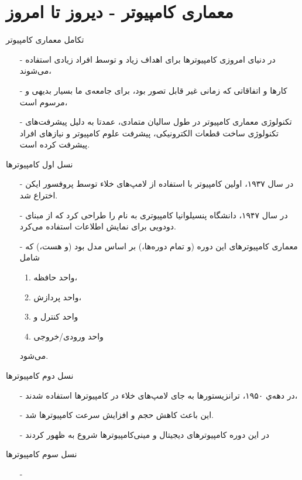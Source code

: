 \section{معماری کامپیوتر - دیروز تا امروز}
\begin{frame}{تکامل معماری کامپیوتر}
\begin{itemize}\itemr
\item[-]
در دنیای امروزی کامپیوتر‌ها برای اهداف زیاد و توسط افراد زیادی استفاده می‌شوند،
\item[-]
کارها و اتفاقاتی که زمانی غیر قابل تصور بود، برای جامعه‌ی ما بسیار بدیهی و مرسوم است،
\item[-]
تکنولوژی معماری‌ کامپیوتر در طول سالیان متمادی، عمدتا به دلیل پیشرفت‌های تکنولوژی ساخت قطعات الکترونیکی، پیشرفت علوم کامپیوتر و نیاز‌‌های افراد پیشرفت کرده است.
\end{itemize}
\end{frame}

\begin{frame}{نسل اول کامپیوتر‌ها}
\begin{itemize}\itemr
\item[-]
در سال ۱۹۳۷، اولین کامپیوتر با استفاده از لامپ‌های خلاء توسط پروفسور ایکن اختراع شد.
\item[-]
در سال ۱۹۴۷، دانشگاه پنسیلوانیا کامپیوتری به نام 
را طراحی کرد که از مبنای دودویی برای نمایش اطلاعات استفاده می‌کرد.
\item[-]
معماری کامپیوتر‌های این دوره (و تمام دوره‌ها،) بر اساس مدل 
بود (و هست،) که شامل 
\begin{enumerate}\itemr
\item 
واحد‌ حافظه،
\item 
واحد پردازش، 
\item 
واحد کنترل و
\item 
واحد ورودی/خروجی 
\end{enumerate}
می‌شود.
\end{itemize}
\end{frame}

\begin{frame}{نسل دوم کامپیوتر‌ها}
\begin{itemize}\itemr
\item[-]
در دهه‌ي ۱۹۵۰، ترانزیستور‌ها به جای لامپ‌های خلاء در کامپیوتر‌ها استفاده شدند،
\item[-]
این باعث کاهش حجم و افزایش سرعت کامپیوتر‌ها شد.
\item[-]
در این دوره کامپیوتر‌های دیجیتال و مینی‌کامپیوترها شروع به ظهور کردند
\end{itemize}
\end{frame}

\begin{frame}{نسل سوم کامپیوتر‌ها}
\begin{itemize}\itemr
\item[-]

\end{itemize}
\end{frame}
